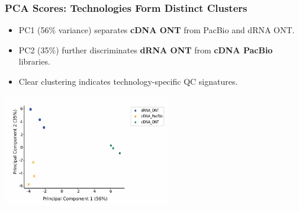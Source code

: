 \documentclass[aspectratio=169]{beamer}
\begin{document}
\begin{frame}
  \frametitle{PCA Scores: Technologies Form Distinct Clusters}
  \begin{itemize}
    \item PC1 (56\% variance) separates \textbf{cDNA ONT} from PacBio and dRNA ONT.
    \item PC2 (35\%) further discriminates \textbf{dRNA ONT} from \textbf{cDNA PacBio} libraries.
    \item Clear clustering indicates technology-specific QC signatures.
  \end{itemize}
  \vfill
  \centering
  \includegraphics[width=0.55\textwidth]{Genome Res_figure2_a.jpg}
\end{frame}
\end{document}

